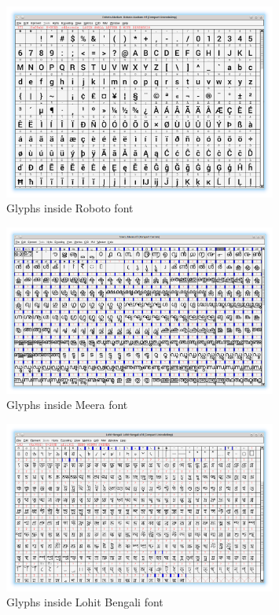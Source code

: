 \begin{figure}[h]
    \centering
    \includegraphics[width=0.8\textwidth]{glyph-fontforge-roboto.png}
    \caption{Glyphs inside Roboto font}
	\label{Robotoglyph}
\end{figure}

\begin{figure}[h]
    \centering
    \includegraphics[width=0.8\textwidth]{glyph-fontforge-meera.png}
    \caption{Glyphs inside Meera font}
	\label{Meeraglyph}
\end{figure}

\begin{figure}[h]
    \centering
    \includegraphics[width=0.8\textwidth]{glyph-fontforge-lohit-bengali.png}
    \caption{Glyphs inside Lohit Bengali font}
\end{figure}

